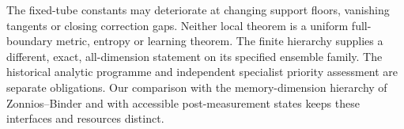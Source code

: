 The fixed-tube constants may deteriorate at changing support floors,
vanishing tangents or closing correction gaps.  Neither local theorem
is a uniform full-boundary metric, entropy or learning theorem.  The
finite hierarchy supplies a different, exact, all-dimension statement on
its specified ensemble family.  The historical analytic programme and
independent specialist priority assessment are separate obligations.
Our comparison with the memory-dimension hierarchy of Zonnios--Binder
\cite{ZB90} and with accessible post-measurement states \cite{EQ90}
keeps these interfaces and resources distinct.
